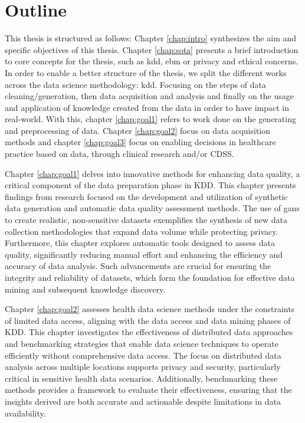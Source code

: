 \chapter*{Outline}



This thesis is structured as follows:
Chapter \ref{chap:intro} synthesizes the aim and specific objectives of this thesis.
Chapter \ref{chap:sota} presents a brief introduction to core concepts for the thesis, such as \ac{kdd}, \ac{ebm} or privacy and ethical concerns.\\
In order to enable a better structure of the thesis, we split the different works across the data science methodology: \ac{kdd}. Focusing on the steps of data cleaning/generation, then data acquisition and analysis and finally on the usage and application of knowledge created from the data in order to have impact in real-world. With this, chapter \ref{chap:goal1} refers to work done on the generating  and preprocessing of data. Chapter \ref{chap:goal2} focus on data acquisition methods and chapter \ref{chap:goal3} focus on enabling decisions in healthcare practice based on data, through clinical research and/or CDSS. 

Chapter \ref{chap:goal1} delves into innovative methods for enhancing data quality, a critical component of the data preparation phase in KDD. This chapter presents findings from research focused on the development and utilization of synthetic data generation and automatic data quality assessment methods. The use of \acp{gan} to create realistic, non-sensitive datasets exemplifies the synthesis of new data collection methodologies that expand data volume while protecting privacy. Furthermore, this chapter explores automatic tools designed to assess data quality, significantly reducing manual effort and enhancing the efficiency and accuracy of data analysis. Such advancements are crucial for ensuring the integrity and reliability of datasets, which form the foundation for effective data mining and subsequent knowledge discovery.

Chapter \ref{chap:goal2} assesses health data science methods under the constraints of limited data access, aligning with the data access and data mining phases of KDD. This chapter investigates the effectiveness of distributed data approaches and benchmarking strategies that enable data science techniques to operate efficiently without comprehensive data access. The focus on distributed data analysis across multiple locations supports privacy and security, particularly critical in sensitive health data scenarios. Additionally, benchmarking these methods provides a framework to evaluate their effectiveness, ensuring that the insights derived are both accurate and actionable despite limitations in data availability.

